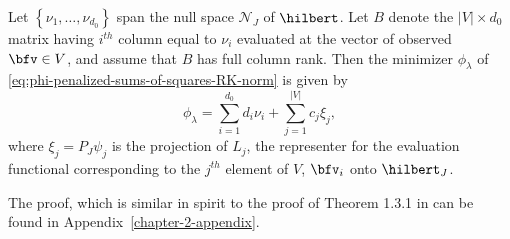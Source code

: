  \begin{theorem} \label{theorem:finite-dimensional-minimizer}
 Let $\left\{\nu_1,\dots, \nu_{d_0}\right\}$ span the null space $\mathcal{N}_J$ of $\hilbert$. Let $B$ denote the $\vert V \vert \times d_0$ matrix having $i^{th}$ column equal to $\nu_i$ evaluated at the vector of observed $\bfv \in V$, and assume that $B$ has full column rank. Then the minimizer $\phi_\lambda$ of \eqref{eq:phi-penalized-sums-of-squares-RK-norm} is given by
 \begin{equation} \label{eq:form-of-the-minimizer-phi}
\phi_\lambda = \sum_{i = 1}^{d_0} d_i \nu_{i} + \sum_{j = 1}^{\vert V \vert} c_j \xi_j,
\end{equation}
\noindent
where $\xi_j = P_J \psi_j$ is the projection of $L_j$, the representer for the evaluation functional corresponding to the $j^{th}$ element of $V$,  ${\bfv_i}$ onto $\hilbert_J$.
\end{theorem}
\vspace{0.5cm}
\noindent
The proof, which is similar in spirit to the proof of Theorem 1.3.1 in \cite{wahba1990spline} can be found in Appendix~\ref{chapter-2-appendix}.

\bigskip

%

\bigskip

